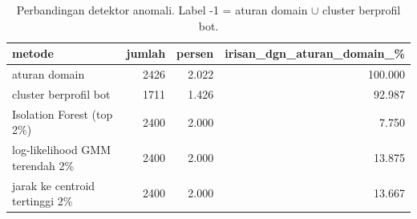 \begin{table}[ht]
\centering\small
\begin{tabular}{lrrr}
\toprule
metode & jumlah & persen & irisan\_dgn\_aturan\_domain\_\% \\
\midrule
aturan domain & 2426 & 2.022 & 100.000 \\
cluster berprofil bot & 1711 & 1.426 & 92.987 \\
Isolation Forest (top 2\%) & 2400 & 2.000 & 7.750 \\
log-likelihood GMM terendah 2\% & 2400 & 2.000 & 13.875 \\
jarak ke centroid tertinggi 2\% & 2400 & 2.000 & 13.667 \\
\bottomrule
\end{tabular}
\caption{Perbandingan detektor anomali. Label -1 = aturan domain $\cup$ cluster berprofil bot.}
\label{tab:t3_anomali}
\end{table}
